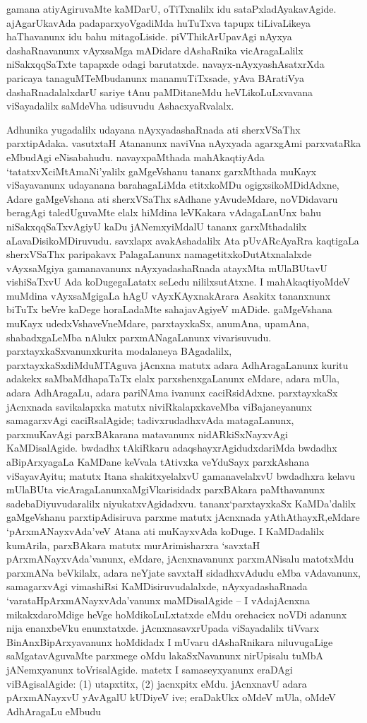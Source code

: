 gamana atiyAgiruvaMte kaMDarU, oTiTxnalilx idu sataPxladAyakavAgide. ajAgarUkavAda padaparxyoVgadiMda huTuTxva tapupx tiLivaLikeya haThavanunx idu bahu mitagoLiside. piVThikArUpavAgi nAyxya dashaRnavanunx vAyxsaMga mADidare dAshaRnika vicAragaLalilx niSakxqqSaTxte tapapxde odagi barutatxde. navayx-nAyxyashAsatxrXda paricaya tanaguMTeMbudanunx manamuTiTxsade, yAva BAratiVya dashaRnadalalxdarU sariye tAnu paMDitaneMdu heVLikoLuLxvavana viSayadalilx saMdeVha udisuvudu AshacxyaRvalalx.

Adhunika yugadalilx udayana nAyxyadashaRnada ati sherxVSaThx parxtipAdaka. \hbox{vasutxtaH} Atananunx naviVna nAyxyada agarxgAmi parxvataRka eMbudAgi eNisabahudu. navayx\-paMthada mahAkaqtiyAda `tatatxvXciMtAmaNi'yalilx gaMgeVshanu tananx garxMthada muKayx viSaya\-vanunx udayanana barahagaLiMda etitxkoMDu ogigxsikoMDidAdxne, Adare gaMgeVshana ati sherxVSaThx sAdhane yAvudeMdare, noVDidavaru beragAgi taledUguvaMte elalx hiMdina leVKa\-kara vAdagaLanUnx bahu niSakxqqSaTxvAgiyU kaDu jANemxyiMdalU tananx garxMthadalilx aLa\-vaDisikoMDiruvudu. savxlapx avakAshadalilx Ata pUvARcAyaRra kaqtigaLa sherxVSaThx paripakavx PalagaLanunx namagetitxkoDutAtxnalalxde vAyxsaMgiya gamanavanunx nAyxyadashaRnada atayxMta mUlaBUtavU vishiSaTxvU Ada koDugegaLatatx seLedu nililxsutAtxne. I mahAkaqti\-yoMdeV muMdina vAyxsaMgigaLa hAgU vAyxKAyxnakArara Asakitx tananxnunx biTuTx beVre kaDege horaLa\-daMte sahajavAgiyeV mADide. gaMgeVshana muKayx udedxVshaveVneMdare, parxtayxkaSx, anu\-mAna, upamAna, shabadxgaLeMba nAlukx parxmANagaLanunx vivarisuvudu. parxtayxkaSxvanunx\break kurita modalaneya BAgadalilx, parxtayxkaSxdiMduMTAguva jAcnxna matutx adara AdhAragaLanunx kuritu adakekx saMbaMdhapaTaTx elalx parxshenxgaLanunx eMdare, adara mUla, adara AdhAragaLu, adara pariNAma ivanunx caciRsidAdxne. parxtayxkaSx jAcnxnada savikalapxka matutx niviRkalapxkaveMba viBajaneyanunx samagarxvAgi caciRsalAgide; tadivxrudadhxvAda matagaLanunx, parxmuKavAgi parxBAkarana matavanunx nidARkiSxNayxvAgi KaMDisalAgide. bwdadhx tAkiRkaru adaqshayxrAgidudxdariMda bwdadhx aBipArxyagaLa KaMDane keVvala tAtivxka veYduSayx parxkAshana viSaya\-vAyitu; matutx Itana shakitxyelalxvU gamanavelalxvU bwdadhxra kelavu mUlaBUta vicAragaLanunx\break aMgiVkarisidadx parxBAkara paMthavanunx sadebaDiyuvudaralilx niyukatxvAgidadxvu. tananx\break `parxtayxkaSx KaMDa'dalilx gaMgeVshanu parxtipAdisiruva parxme matutx jAcnxnada yAthAthayxR,\break eMdare `pArxmANayxvAda'veV Atana ati muKayxvAda koDuge. I KaMDadalilx kumA\-rila, parxBAkara matutx murArimisharxra `savxtaH pArxmANayxvAda'vanunx, eMdare, jAcnxnavanunx parxmANisalu matotxMdu parxmANa beVkilalx, adara neYjate savxtaH sidadhxvAdudu eMba vAdavanunx, samagarxvAgi vimashiRsi KaMDisiruvudalalxde, nAyxyadashaRnada `varataH\break\-pArxmANayxvAda'vanunx maMDisalAgide -- I vAdajAcnxna mikakxdaroMdige heVge hoMdi\-koLuLxtatxde eMdu orehacicx noVDi adanunx nija enanxbeVku enunxtatxde. jAcnxnasavxrUpada viSayadalilx tiVvarx BinAnxBipArxyavanunx hoMdidadx I mUvaru dAshaRnikara niluvu\-gaLige saMgatavAguvaMte parxmege oMdu lakaSxNavanunx nirUpisalu tuMbA jANemxyanunx toVrisalAgide. matetx I samaseyxyanunx eraDAgi viBAgisalAgide: (1) utapxtitx, (2) jacnxpitx eMdu. jAcnxnavU adara pArxmANayxvU yAvAgalU kUDiyeV ive; eraDakUkx oMdeV mUla, oMdeV AdhAragaLu eMbudu 